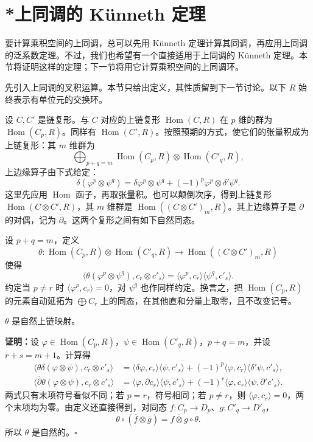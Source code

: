 \section{*上同调的 Künneth 定理}
要计算乘积空间的上同调，总可以先用 Künneth 定理计算其同调，再应用上同调的泛系数定理。不过，我们也希望有一个直接适用于上同调的 Künneth 定理。本节将证明这样的定理；下一节将用它计算乘积空间的上同调环。

先引入上同调的叉积运算。本节只给出定义，其性质留到下一节讨论。以下 $R$ 始终表示有单位元的交换环。

设 $C,C'$ 是链复形。与 $C$ 对应的上链复形 $\operatorname{Hom}(C,R)$ 在 $p$ 维的群为 $\operatorname{Hom}(C_p,R)$。同样有 $\operatorname{Hom}(C',R)$。按照预期的方式，使它们的张量积成为上链复形：其 $m$ 维群为
\[
\bigoplus_{p+q=m}\operatorname{Hom}(C_p,R)\otimes\operatorname{Hom}(C'_q,R),
\]
上边缘算子由下式给定：
\[
\delta(\varphi^p\otimes\psi^q)=\delta\varphi^p\otimes\psi^q+(-1)^p\varphi^p\otimes\delta'\psi^q.
\]
这里先应用 $\operatorname{Hom}$ 函子，再取张量积。也可以颠倒次序，得到上链复形 $\operatorname{Hom}(C\otimes C',R)$，其 $m$ 维群是 $\operatorname{Hom}((C\otimes C')_m,R)$。其上边缘算子是 $\partial$ 的对偶，记为 $\overline\partial$。这两个复形之间有如下自然同态。

设 $p+q=m$，定义
\[
\theta:\operatorname{Hom}(C_p,R)\otimes\operatorname{Hom}(C'_q,R)\longrightarrow\operatorname{Hom}((C\otimes C')_m,R)
\]
使得
\[
\langle\theta(\varphi^p\otimes\psi^q),c_r\otimes c'_s\rangle
=\langle\varphi^p,c_r\rangle\langle\psi^q,c'_s\rangle.
\]
约定当 $p\ne r$ 时 $\langle\varphi^p,c_r\rangle=0$，对 $\psi^q$ 也作同样约定。换言之，把 $\operatorname{Hom}(C_p,R)$ 的元素自动延拓为 $\bigoplus C_r$ 上的同态，在其他直和分量上取零，且不改变记号。

$\theta$ 是自然上链映射。

\textbf{证明：}设 $\varphi\in\operatorname{Hom}(C_p,R)$，$\psi\in\operatorname{Hom}(C'_q,R)$，$p+q=m$，并设 $r+s=m+1$。计算得
\begin{align*}
\langle\theta\delta(\varphi\otimes\psi),c_r\otimes c'_s\rangle
&=\langle\delta\varphi,c_r\rangle\langle\psi,c'_s\rangle
+(-1)^p\langle\varphi,c_r\rangle\langle\delta'\psi,c'_s\rangle,\\
\langle\overline\partial\theta(\varphi\otimes\psi),c_r\otimes c'_s\rangle
&=\langle\varphi,\partial c_r\rangle\langle\psi,c'_s\rangle
+(-1)^r\langle\varphi,c_r\rangle\langle\psi,\partial'c'_s\rangle.
\end{align*}
两式只有末项符号看似不同；若 $p=r$，符号相同；若 $p\ne r$，则 $\langle\varphi,c_r\rangle=0$，两个末项均为零。由定义还直接得到，对同态 $f:C_p\to D_p$、$g:C'_q\to D'_q$，
\[
\theta\circ(\overline f\otimes\overline g)=\overline{f\otimes g}\circ\theta.
\]
所以 $\theta$ 是自然的。\hfill$\square$

